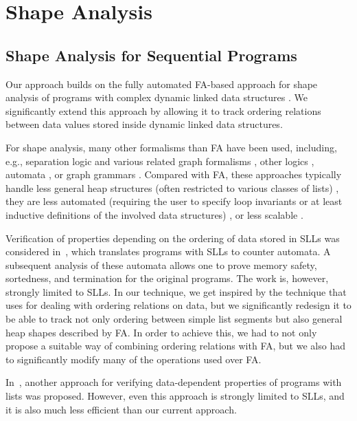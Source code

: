 \section{Shape Analysis}
\subsection{Shape Analysis for Sequential Programs}
Our approach builds on the fully automated FA-based
approach for shape analysis of programs with complex dynamic linked data
structures \cite{forester11,Forester}. We significantly extend this approach by
allowing it to track ordering relations between data values stored inside
dynamic linked data structures. 

For shape analysis, many other formalisms than FA have been used, including,
e.g., separation logic and various related graph formalisms
\cite{Hongseok:SL,thor10,rival11,Kamil:SL}, other logics \cite{SagivRW02,Jakob:ML},
automata \cite{artmc12}, or graph grammars \cite{Jonathan:Shape}. Compared with FA,
these approaches typically handle less general heap structures (often restricted
to various classes of lists) \cite{Hongseok:SL,Kamil:SL}, they are less
automated (requiring the user to specify loop invariants or at least inductive
definitions of the involved data structures)
\cite{thor10,rival11,Kamil:SL,Jonathan:Shape}, or less scalable \cite{artmc12}.

Verification of properties depending on the ordering of data stored in SLLs was
considered in~\cite{lists-counters}, which translates programs with SLLs to
counter automata. A subsequent analysis of these automata allows one to prove
memory safety, sortedness, and termination for the original programs. The work
is, however, strongly limited to SLLs. In our technique, we get inspired by the technique
that \cite{lists-counters} uses for dealing with ordering relations on data, but
we significantly redesign it to be able to track not only ordering between
simple list segments but also general heap shapes described by FA. In order to
achieve this, we had to not only propose a suitable way of combining ordering
relations with FA, but we also had to significantly modify many of the
operations used over FA.

In~\cite{atva09}, another approach for verifying data-dependent properties of
programs with lists was proposed. However, even this approach is strongly
limited to SLLs, and it is also much less efficient than our current approach.


